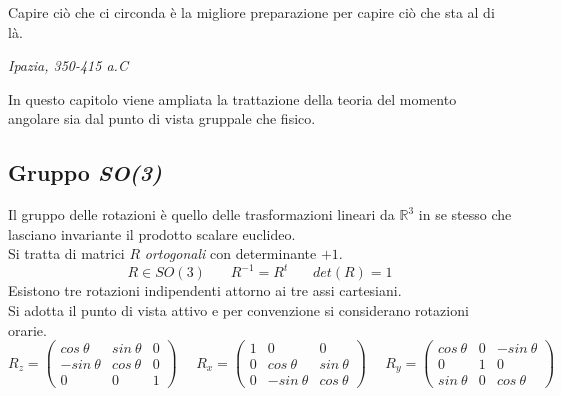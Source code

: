 \documentclass[twoside]{article}
\begin{document}
\vspace{9mm}
\epigraph{Capire ciò che ci circonda è la migliore preparazione per capire ciò che sta al di là.}{\textit{Ipazia, 350-415 a.C}}
\vspace{9mm}

In questo capitolo viene ampliata la trattazione della teoria del momento angolare sia dal punto di vista gruppale che fisico.

\vspace{0.5cm}
\subsection{Gruppo \textit{SO(3)}}
Il gruppo delle rotazioni è quello delle trasformazioni lineari da $\mathds{R}^3$ in se stesso che lasciano invariante il prodotto scalare euclideo.
\\
Si tratta di matrici $R$ \textit{ortogonali} con determinante $+1$.
\begin{equation}
    R \in SO(3) \ \ \ \ \ \ \ \ R^{-1}=R^t \ \ \ \ \ \ \ \ det(R)=1
\end{equation}
Esistono tre rotazioni indipendenti attorno ai tre assi cartesiani.
\\
Si adotta il punto di vista attivo e per convenzione si considerano rotazioni orarie.
\begin{equation}
    R_z=\begin{pmatrix}
    cos\ \theta & sin\ \theta & 0 \\
    -sin\ \theta & cos\ \theta & 0 \\
    0 & 0 & 1 
    \end{pmatrix} \ \ \ \ \ \ R_x=\begin{pmatrix}
    1 & 0 & 0 \\
    0 & cos \ \theta & sin \ \theta \\
    0 & -sin \ \theta & cos \ \theta
    \end{pmatrix} \ \ \ \ \ \ R_y=\begin{pmatrix}
    cos \ \theta & 0 & -sin \ \theta \\
    0 & 1 & 0 \\
    sin \ \theta & 0 & cos \ \theta
    \end{pmatrix}
\end{equation}
\end{document}
